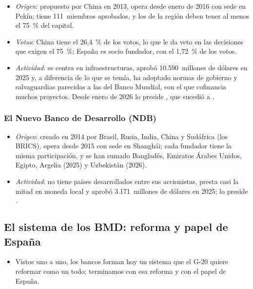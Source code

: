 \documentclass[11pt]{article}
\begin{document}
\begin{itemize}
\item \emph{Origen}: propuesto por China en 2013, opera desde enero de 2016 con sede en Pekín; tiene 111~miembros aprobados, y los de la región deben tener al menos el 75~\% del capital.
\item \emph{Votos}: China tiene el 26,4~\% de los votos, lo que le da veto en las decisiones que exigen el 75~\%; España es socio fundador, con el 1,72~\% de los votos\nocite{BAII2026Miembros}.
\item \emph{Actividad}: se centra en infraestructuras, aprobó 10.590~millones de dólares en 2025 y, a diferencia de lo que se temía, ha adoptado normas de gobierno y salvaguardias parecidas a las del Banco Mundial, con el que cofinancia muchos proyectos. Desde enero de 2026 lo preside , que sucedió a \nocite{BAII2026Informe}.
\end{itemize}

\subsubsection{El Nuevo Banco de Desarrollo (NDB)}\label{sec:ndb}

\begin{itemize}
\item \emph{Origen}: creado en 2014 por Brasil, Rusia, India, China y Sudáfrica (los BRICS), opera desde 2015 con sede en Shanghái; cada fundador tiene la misma participación, y se han sumado Bangladés, Emiratos Árabes Unidos, Egipto, Argelia (2025) y Uzbekistán (2026).
\item \emph{Actividad}: no tiene países desarrollados entre sus accionistas, presta casi la mitad en moneda local y aprobó 3.171~millones de dólares en 2025; lo preside \nocite{NDB2026Informe}.
\end{itemize}

\subsection{El sistema de los BMD: reforma y papel de España}\label{sec:espana}

\begin{itemize}
\item Vistos uno a uno, los bancos forman hoy un sistema que el G-20 quiere reformar como un todo; terminamos con esa reforma y con el papel de España.
\end{itemize}
\end{document}
